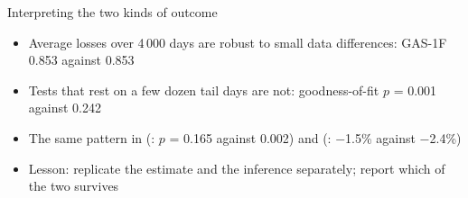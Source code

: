 \begin{frame}{Interpreting the two kinds of outcome}
\itemsize{\small}
\begin{itemize}
    \item Average losses over 4\,000 days are robust to small data differences: GAS-1F 0.853 against 0.853
    \item Tests that rest on a few dozen tail days are not: goodness-of-fit $p$ = 0.001 against 0.242
    \item The same pattern in  (: $p$ = 0.165 against 0.002) and  (: $-$1.5\% against $-$2.4\%)
    \item Lesson: replicate the estimate and the inference separately; report which of the two survives
\end{itemize}
\end{frame}

